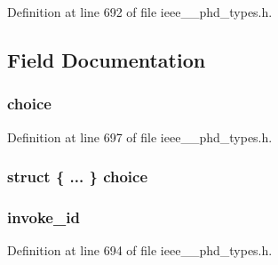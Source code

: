 Definition at line 692 of file ieee\+\_\+\_\+phd\+\_\+types.\+h.



\subsection{Field Documentation}
\hypertarget{struct___d_a_t_a__apdu_a034761fd73babd925f56cbb254ce4fb2}{}
\subsubsection[{choice}]{ choice}\label{struct___d_a_t_a__apdu_a034761fd73babd925f56cbb254ce4fb2}


Definition at line 697 of file ieee\+\_\+\_\+phd\+\_\+types.\+h.

\hypertarget{struct___d_a_t_a__apdu_a8334e01b255f1a5eec983b216ae9fad6}{}
\subsubsection[{choice}]{\setlength{\rightskip}{0pt plus 5cm}struct \{ ... \}   choice}\label{struct___d_a_t_a__apdu_a8334e01b255f1a5eec983b216ae9fad6}
\hypertarget{struct___d_a_t_a__apdu_a204a1befd9f114ab6f2192071d0c367d}{}
\subsubsection[{invoke\+\_\+id}]{ invoke\+\_\+id}\label{struct___d_a_t_a__apdu_a204a1befd9f114ab6f2192071d0c367d}


Definition at line 694 of file ieee\+\_\+\_\+phd\+\_\+types.\+h.

\hypertarget{struct___d_a_t_a__apdu_a3743679e4ff85e3e1b3fc2e59973fbb3}{}
